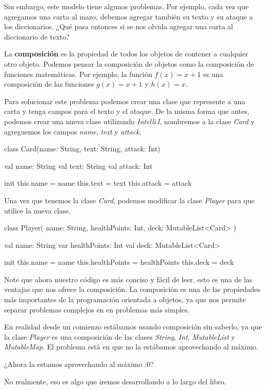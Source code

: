   Sin embargo, este modelo tiene algunos problemas.
  Por ejemplo, cada vez que agregamos una carta al mazo, debemos agregar también su texto y su
  ataque a los diccionarios.
  ¿Qué pasa entonces si se nos olvida agregar una carta al diccionario de texto?

  \begin{defaultbox}[Composición]
    La \textbf{composición} es la propiedad de todos los objetos de contener a 
    cualquier otro objeto.
    Podemos pensar la composición de objetos como la composición de funciones matemáticas.
    Por ejemplo, la función \(f(x) = x + 1\) es una composición de las funciones \(g(x) = x + 1\) y
    \(h(x) = x\).
  \end{defaultbox}

  Para solucionar este problema podemos crear una clase que represente a una carta y tenga campos
  para el texto y el ataque.
  De la misma forma que antes, podemos crear una nueva clase utilizando \textit{IntelliJ}, 
  nombremos a la clase \textit{Card} y agreguemos los campos \textit{name}, \textit{text} y
  \textit{attack}.

  \begin{kotlin}
    class Card(name: String, text: String, attack: Int) {
      val name: String
      val text: String
      val attack: Int

      init {
        this.name = name
        this.text = text
        this.attack = attack
      }
    }
  \end{kotlin}

  Una vez que tenemos la clase \textit{Card}, podemos modificar la clase \textit{Player} para que
  utilice la nueva clase.

  \begin{kotlin}
    class Player(
      name: String,
      healthPoints: Int,
      deck: MutableList<Card>
    ) {
      val name: String
      var healthPoints: Int
      val deck: MutableList<Card>

      init {
        this.name = name
        this.healthPoints = healthPoints
        this.deck = deck
      }
    }
  \end{kotlin}

  Note que ahora nuestro código es más conciso y fácil de leer, esto es una de las ventajas que
  nos ofrece la composición.
  La composición es una de las propiedades más importantes de la programación orientada a objetos,
  ya que nos permite separar problemas complejos en en problemas más simples.

  En realidad desde un comienzo estábamos usando composición sin saberlo, ya que la clase 
  \textit{Player} es una composición de las clases \textit{String}, \textit{Int}, 
  \textit{MutableList} y \textit{MutableMap}.
  El problema está en que no la estábamos aprovechando al máximo.

  \begin{center}
    ¿Ahora la estamos aprovechando al máximo :0?
  \end{center}

  No realmente, eso es algo que iremos desarrollando a lo largo del libro.
